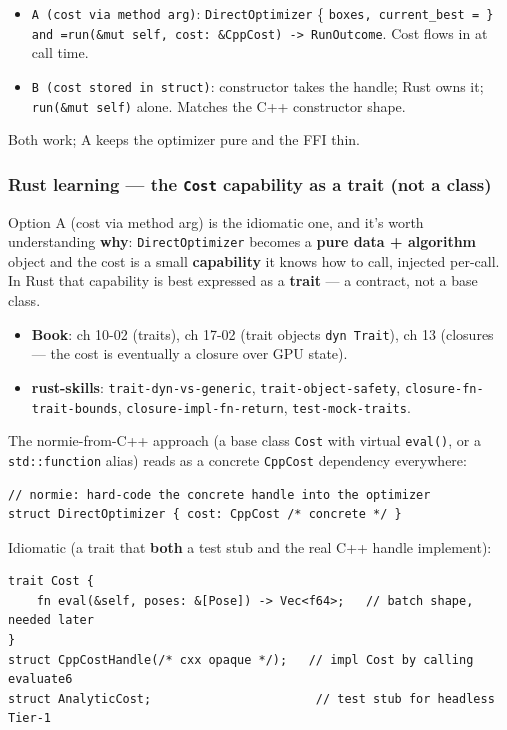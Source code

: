 \documentclass[11pt]{article}
\begin{document}
\begin{itemize}
\item \texttt{A (cost via method arg)}: \texttt{DirectOptimizer} \{ \texttt{boxes, current\_best = \} and
  =run(\&mut self, cost: \&CppCost) -> RunOutcome}. Cost flows in at call time.
\item \texttt{B (cost stored in struct)}: constructor takes the handle; Rust owns it;
\texttt{run(\&mut self)} alone. Matches the C++ constructor shape.
\end{itemize}

Both work; A keeps the optimizer pure and the FFI thin.
\subsubsection{Rust learning — the \texttt{Cost} capability as a trait (not a class)}
\label{sec:org39030e3}

Option A (cost via method arg) is the idiomatic one, and it's worth
understanding \textbf{why}: \texttt{DirectOptimizer} becomes a \textbf{\textbf{pure data + algorithm}}
object and the cost is a small \textbf{\textbf{capability}} it knows how to call, injected
per-call. In Rust that capability is best expressed as a \textbf{\textbf{trait}} — a
contract, not a base class.

\begin{itemize}
\item \textbf{\textbf{Book}}: ch 10-02 (traits), ch 17-02 (trait objects \texttt{dyn Trait}),
ch 13 (closures — the cost is eventually a closure over GPU state).
\item \textbf{\textbf{rust-skills}}: \texttt{trait-dyn-vs-generic}, \texttt{trait-object-safety},
\texttt{closure-fn-trait-bounds}, \texttt{closure-impl-fn-return}, \texttt{test-mock-traits}.
\end{itemize}

The normie-from-C++ approach (a base class \texttt{Cost} with virtual \texttt{eval()}, or a
\texttt{std::function} alias) reads as a concrete \texttt{CppCost} dependency everywhere:

\begin{verbatim}
// normie: hard-code the concrete handle into the optimizer
struct DirectOptimizer { cost: CppCost /* concrete */ }
\end{verbatim}

Idiomatic (a trait that \textbf{both} a test stub and the real C++ handle implement):

\begin{verbatim}
trait Cost {
    fn eval(&self, poses: &[Pose]) -> Vec<f64>;   // batch shape, needed later
}
struct CppCostHandle(/* cxx opaque */);   // impl Cost by calling evaluate6
struct AnalyticCost;                       // test stub for headless Tier-1
\end{verbatim}
\end{document}
